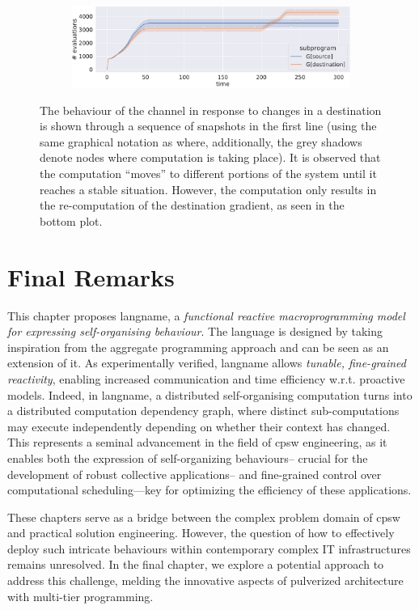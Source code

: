 \begin{figure}
\begin{subfigure}[b]{0.24\linewidth}
      \caption{}
      \label{acsos2023-frp:fig:finish}
  \end{subfigure}\hfill
  \begin{subfigure}[b]{\linewidth}
    \centering
    \includegraphics[width=\textwidth]{papers/acsos2023-frp/imgs/message_count.pdf}
  \end{subfigure}
  \caption[behaviour of the channel in response to changes in a destination]{
  The behaviour of the channel in response to changes in a destination is shown through a sequence of snapshots in the first line (using the same graphical notation as  where, additionally, the grey shadows denote nodes where computation is taking place). 
  It is observed that the computation ``moves'' to different portions of the system until it reaches a stable situation. 
  However, the computation only results in the re-computation of the destination gradient, as seen in the bottom plot.
  }
  \label{acsos2023-frp:fig:subprogram-eval}
\end{figure}

\section{Final Remarks}
\label{acsos2023-frp:sec:conc}

This chapter proposes \ac{langname},
 a \emph{functional reactive macroprogramming model
 for expressing self-organising behaviour}.
%
The language is designed by taking inspiration 
 from the aggregate programming approach and can be seen as an extension of it.
%
As experimentally verified,
 \ac{langname} allows \emph{tunable, fine-grained reactivity},
 enabling increased communication and time efficiency
 w.r.t. proactive models.
%
Indeed, in \ac{langname},
 a distributed self-organising computation
 turns into a distributed computation dependency graph,
 where distinct sub-computations may execute independently 
 depending on whether their context has changed.
This represents a seminal advancement in the field of \ac{cpsw} engineering, 
 as it enables both the expression of self-organizing behaviours--
 crucial for the development of robust collective applications--
 and fine-grained control over computational scheduling—key for optimizing the efficiency of these applications.

These chapters serve as a bridge between the complex problem domain of \ac{cpsw} and practical solution engineering. 
 However, the question of how to effectively deploy such intricate behaviours within contemporary complex IT infrastructures remains unresolved.
%
In the final chapter, we explore a potential approach to address this challenge, 
 melding the innovative aspects of pulverized architecture with multi-tier programming.